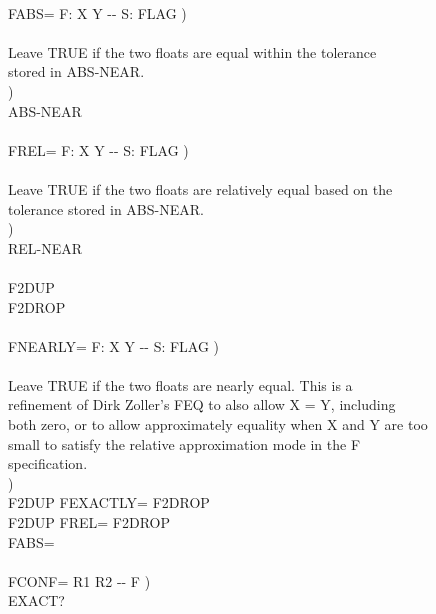 \begin{tt}
\\
\tab \word{:} FABS=   F: X Y -{}- S: FLAG ) \\
\tab[2]  \\
\tab[2] Leave TRUE if the two floats are equal within the tolerance \\
\tab[2] stored in ABS-NEAR. \\
\tab[2] ) \\
\tab[2] ABS-NEAR   \word{;} \\
\\
\tab \word{:} FREL=   F: X Y -{}- S: FLAG ) \\
\tab[2]  \\
\tab[2] Leave TRUE if the two floats are relatively equal based on the \\
\tab[2] tolerance stored in ABS-NEAR. \\
\tab[2] ) \\
\tab[2] REL-NEAR    \word{;} \\
\\
\tab \word{:} F2DUP    \word{;} \\
\tab \word{:} F2DROP   \word{;} \\
\\
\tab \word{:} FNEARLY=   F: X Y -{}- S: FLAG ) \\
\tab[2]  \\
\tab[2] Leave TRUE if the two floats are nearly equal.  This is a  \\
\tab[2] refinement of Dirk Zoller's FEQ to also allow X = Y, including \\
\tab[2] both zero, or to allow approximately equality when X and Y are too \\
\tab[2] small to satisfy the relative approximation mode in the F\tilde{\space} \\
\tab[2] specification. \\
\tab[2] ) \\
\tab[2] F2DUP FEXACTLY=  F2DROP    \\
\tab[2] F2DUP FREL=      F2DROP    \\
\tab[2] FABS= \word{;} \\
\\
\tab \word{:} FCONF=  R1 R2 -{}- F ) \\
\tab[2] EXACT?  \\

\end{tt}
